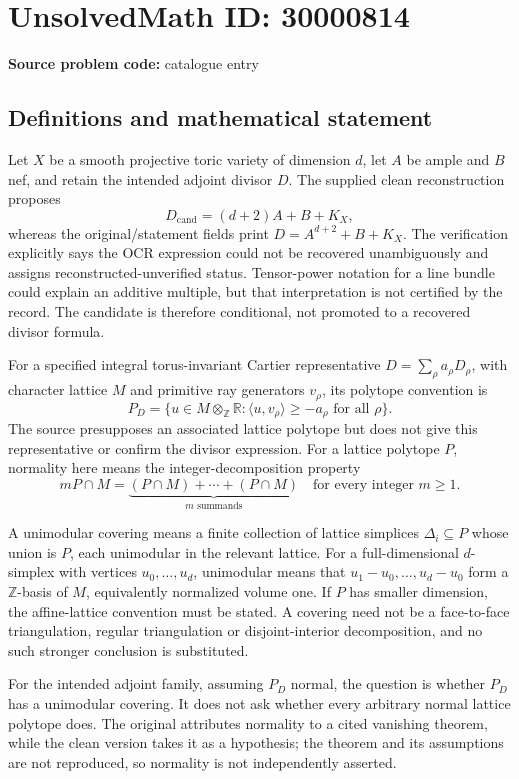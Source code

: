 \documentclass[11pt]{article}
\newcommand{\Z}{\mathbb{Z}}
\newcommand{\R}{\mathbb{R}}
\begin{document}
\section*{UnsolvedMath ID: 30000814}
\textbf{Source problem code:} catalogue entry
\subsection{Definitions and mathematical statement}
Let \(X\) be a smooth projective toric variety of dimension \(d\), let \(A\) be ample and \(B\) nef, and retain the intended adjoint divisor \(D\). The supplied clean reconstruction proposes
\[
 D_{\mathrm{cand}}=(d+2)A+B+K_X,
\]
whereas the original/statement fields print \(D=A^{d+2}+B+K_X\). The verification explicitly says the OCR expression could not be recovered unambiguously and assigns reconstructed-unverified status. Tensor-power notation for a line bundle could explain an additive multiple, but that interpretation is not certified by the record. The candidate is therefore conditional, not promoted to a recovered divisor formula.

For a specified integral torus-invariant Cartier representative \(D=\sum_\rho a_\rho D_\rho\), with character lattice \(M\) and primitive ray generators \(v_\rho\), its polytope convention is
\[
 P_D=\{u\in M\otimes_\Z\R:\langle u,v_\rho\rangle\geq-a_\rho\text{ for all }\rho\}.
\]
The source presupposes an associated lattice polytope but does not give this representative or confirm the divisor expression. For a lattice polytope \(P\), normality here means the integer-decomposition property
\[
 mP\cap M=\underbrace{(P\cap M)+\cdots+(P\cap M)}_{m\text{ summands}}
 \quad\text{for every integer }m\geq1.
\]

A unimodular covering means a finite collection of lattice simplices \(\Delta_i\subseteq P\) whose union is \(P\), each unimodular in the relevant lattice. For a full-dimensional \(d\)-simplex with vertices \(u_0,\ldots,u_d\), unimodular means that \(u_1-u_0,\ldots,u_d-u_0\) form a \(\Z\)-basis of \(M\), equivalently normalized volume one. If \(P\) has smaller dimension, the affine-lattice convention must be stated. A covering need not be a face-to-face triangulation, regular triangulation or disjoint-interior decomposition, and no such stronger conclusion is substituted.

For the intended adjoint family, assuming \(P_D\) normal, the question is whether \(P_D\) has a unimodular covering. It does not ask whether every arbitrary normal lattice polytope does. The original attributes normality to a cited vanishing theorem, while the clean version takes it as a hypothesis; the theorem and its assumptions are not reproduced, so normality is not independently asserted.
\end{document}
